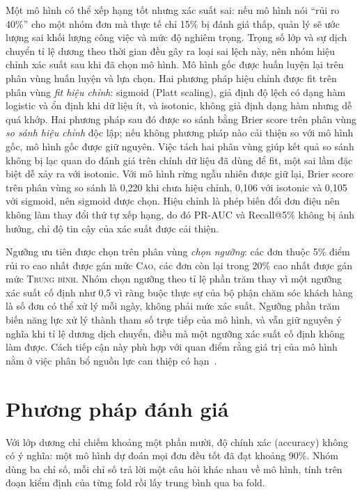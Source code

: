 Một mô hình có thể xếp hạng tốt nhưng xác suất sai: nếu mô hình nói ``rủi ro 40\%'' cho một nhóm đơn mà thực tế chỉ 15\% bị đánh giá thấp, quản lý sẽ ước lượng sai khối lượng công việc và mức độ nghiêm trọng. Trọng số lớp và sự dịch chuyển tỉ lệ dương theo thời gian đều gây ra loại sai lệch này, nên nhóm hiệu chỉnh xác suất sau khi đã chọn mô hình. Mô hình gốc được huấn luyện lại trên phân vùng huấn luyện và lựa chọn. Hai phương pháp hiệu chỉnh được fit trên phân vùng \emph{fit hiệu chỉnh}: sigmoid (Platt scaling), giả định độ lệch có dạng hàm logistic và ổn định khi dữ liệu ít, và isotonic, không giả định dạng hàm nhưng dễ quá khớp. Hai phương pháp sau đó được so sánh bằng Brier score trên phân vùng \emph{so sánh hiệu chỉnh} độc lập; nếu không phương pháp nào cải thiện so với mô hình gốc, mô hình gốc được giữ nguyên. Việc tách hai phân vùng giúp kết quả so sánh không bị lạc quan do đánh giá trên chính dữ liệu đã dùng để fit, một sai lầm đặc biệt dễ xảy ra với isotonic. Với mô hình rừng ngẫu nhiên được giữ lại, Brier score trên phân vùng so sánh là 0,220 khi chưa hiệu chỉnh, 0,106 với isotonic và 0,105 với sigmoid, nên sigmoid được chọn. Hiệu chỉnh là phép biến đổi đơn điệu nên không làm thay đổi thứ tự xếp hạng, do đó PR-AUC và Recall@5\% không bị ảnh hưởng, chỉ độ tin cậy của xác suất được cải thiện.

Ngưỡng ưu tiên được chọn trên phân vùng \emph{chọn ngưỡng}: các đơn thuộc 5\% điểm rủi ro cao nhất được gán mức \textsc{Cao}, các đơn còn lại trong 20\% cao nhất được gán mức \textsc{Trung bình}. Nhóm chọn ngưỡng theo tỉ lệ phần trăm thay vì một ngưỡng xác suất cố định như 0,5 vì ràng buộc thực sự của bộ phận chăm sóc khách hàng là số đơn có thể xử lý mỗi ngày, không phải mức xác suất. Ngưỡng phần trăm biến năng lực xử lý thành tham số trực tiếp của mô hình, và vẫn giữ nguyên ý nghĩa khi tỉ lệ dương dịch chuyển, điều mà một ngưỡng xác suất cố định không làm được. Cách tiếp cận này phù hợp với quan điểm rằng giá trị của mô hình nằm ở việc phân bổ nguồn lực can thiệp có hạn~\cite{gomezvargas2025}.

\section{Phương pháp đánh giá}\label{sec:eval}

Với lớp dương chỉ chiếm khoảng một phần mười, độ chính xác (accuracy) không có ý nghĩa: một mô hình dự đoán mọi đơn đều tốt đã đạt khoảng 90\%. Nhóm dùng ba chỉ số, mỗi chỉ số trả lời một câu hỏi khác nhau về mô hình, tính trên đoạn kiểm định của từng fold rồi lấy trung bình qua ba fold.

